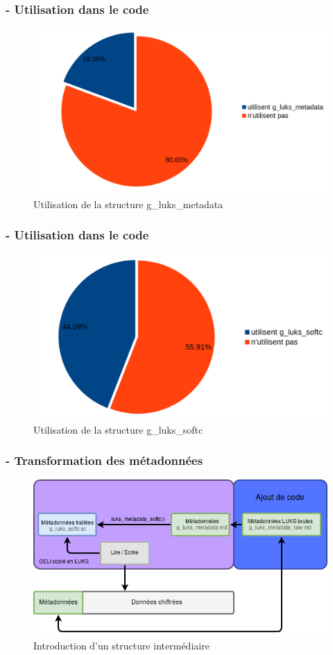 \begin{frame}
	\frametitle{\insertsubsectionhead - Utilisation dans le code}
	\begin{figure}
		\includegraphics[width=.8\textwidth]{developpement/fonctions_g_luks_metadata}
		\caption{Utilisation de la structure g\_luks\_metadata}
	\end{figure}
\end{frame}
\begin{frame}
	\frametitle{\insertsubsectionhead - Utilisation dans le code}
	\begin{figure}
		\includegraphics[width=.8\textwidth]{developpement/fonctions_g_luks_softc}
		\caption{Utilisation de la structure g\_luks\_softc}
	\end{figure}
\end{frame}

\begin{frame}
	\frametitle{\insertsubsectionhead - Transformation des métadonnées}
	\begin{figure}
		\includegraphics[width=\textwidth]{developpement/utilisation_metadonnee_luks}
		\caption{Introduction d'un structure intermédiaire}
	\end{figure}
\end{frame}


